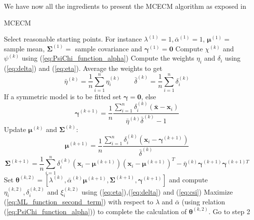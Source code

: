 We have now all the ingredients to present the MCECM algorithm as exposed in \cite{Brey2013}
\begin{algorithm}[H]
	\caption{MCECM}
	\begin{algorithmic}[1]
		\State Select reasonable starting points. For instance $\lambda^{(1)}=1,\bar{\alpha}^{(1)}=1$, $\bm{\mu}^{(1)}=$ sample mean, $\bm{\Sigma}^{(1)}=$ sample covariance and $\bm{\gamma}^{(1)} = \bm{0}$
		\State Compute $\chi^{(k)}$ and $\psi^{(k)}$ using (\ref{eq:PsiChi_function_alpha})
		\State Compute the weights $\eta_i$ and $\delta_i$ using (\ref{eq:delta}) and (\ref{eq:eta}). Average the weights to get \[ \bar{\eta}^{(k)}=\frac{1}{n}\sum_{i=1}^{n}\eta_i^{(k)} \quad  \quad \bar{\delta}^{(k)}=\frac{1}{n}\sum_{i=1}^{n}\delta_i^{(k)} \]
		\State If a symmetric model is to be fitted set $\bm{\gamma} = \bm{0}$, else \[ \bm{\gamma}^{(k+1)} = \frac{1}{n}\frac{\sum_{i=1}^{n}\delta_i^{(k)}(\bar{\bm{x}}-\bm{x}_i)}{\bar{\eta}^{(k)}\bar{\delta}^{(k)}-1} \]
		\State Update $\bm{\mu}^{(k)}$ and $\bm{\Sigma}^{(k)}$: \[ \bm{\mu}^{(k+1)} = \frac{1}{n}\frac{\sum_{i=1}^{n}\delta_i^{(k)}(\bm{x}_i-\bm{\gamma}^{(k+1)})}{\bar{\delta}^{(k)}} \]
		\[ \bm{\Sigma}^{(k+1)}=\frac{1}{n}\sum_{i=1}^{n}\delta_i^{(k)}(\bm{x}_i-\bm{\mu}^{(k+1)})(\bm{x}_i-\bm{\mu}^{(k+1)})^T-\bar{\eta}^{(k)}\bm{\gamma}^{(k+1)} \bm{\gamma}^{(k+1)T}   \]
		\State Set $\bm{\theta}^{(k,2)}=[\lambda^{(k)},\bar{\alpha}^{(k)}\bm{\mu}^{(k+1)},\bm{\Sigma}^{(k+1)},\bm{\gamma}^{(k+1)}]$ and compute $\eta_i^{(k,2)},\delta_i^{(k,2)}$ and $\xi_i^{(k,2)}$ using (\ref{eq:eta}),(\ref{eq:delta}) and (\ref{eq:csi})
		\State Maximize (\ref{eq:ML_function_second_term}) with respect to $\lambda$ and $\bar{\alpha}$ (using relation (\ref{eq:PsiChi_function_alpha})) to complete the calculation of $\bm{\theta}^{(k,2)}$. Go to step 2
	\end{algorithmic}
\end{algorithm}




